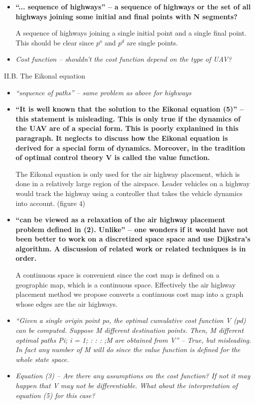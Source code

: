 \documentclass[submit]{aiaa-pretty}
\begin{document}
\begin{itemize}
\item \textbf{``... sequence of highways'' – a sequence of highways or the set of all highways joining some initial and final points with N segments?}

A sequence of highways joining a single initial point and a single final point. This should be clear since $p^o$ and $p^d$ are single points.

\item \textit{Cost function – shouldn’t the cost function depend on the type of UAV?}
\end{itemize}

II.B. The Eikonal equation
\begin{itemize}
\item \textit{``sequence of paths'' – same problem as above for highways}
\item \textbf{``It is well known that the solution to the Eikonal equation (5)'' – this statement is misleading. This is only true if the dynamics of the UAV are of a special form. This is poorly explanined in this paragraph. It neglects to discuss how the Eikonal equation is derived for a special form of dynamics. Moreover, in the tradition of optimal control theory V is called the value function.}

The Eikonal equation is only used for the air highway placement, which is done in a relatively large region of the airspace. Leader vehicles on a highway would track the highway using a controller that takes the vehicle dynamics into account. (figure 4)

\item \textbf{``can be viewed as a relaxation of the air highway placement problem defined in (2). Unlike'' – one wonders if it would have not been better to work on a discretized space space and use Dijkstra’s algorithm. A discussion of related work or related techniques is in order.}

A continuous space is convenient since the cost map is defined on a geographic map, which is a continuous space. Effectively the air highway placement method we propose converts a continuous cost map into a graph whose edges are the air highways.

\item \textit{``Given a single origin point po, the optimal cumulative cost function V (pd) can be computed. Suppose M different destination points. Then, M different optimal paths Pi; i = 1; : : : ;M are obtained from V'' – True, but misleading. In fact any number of M will do since the value function is defined for the whole state space.}
\item \textit{ Equation (3) – Are there any assumptions on the cost function? If not it may happen that V may not be differentiable. What about the interpretation of equation (5) for this case?}
\end{itemize}
\end{document}
